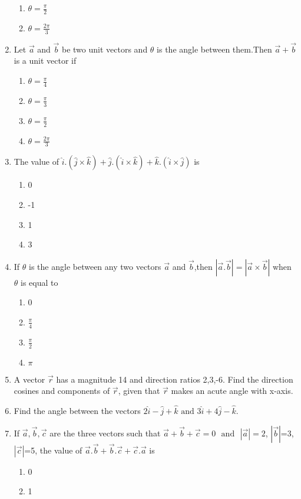 \begin{enumerate}[label=\thesubsection.\arabic*,ref=\thesubsection.\theenumi]
\begin{enumerate}
		\item $\theta = \frac{\pi}{2}$
		\item $\theta = \frac{2\pi}{3}$
			\end{enumerate}
\solution

\item Let $\vec{a}$ and $\vec{b}$ be two unit vectors and $\theta$ is the angle between them.Then $\vec{a}+\vec{b}$ is a unit vector if
\begin{enumerate}
\item $\theta=\frac{\pi}{4}$
\item $\theta=\frac{\pi}{3}$
\item $\theta=\frac{\pi}{2}$
\item $\theta=\frac{2\pi}{3}$
\end{enumerate}
\item The value of $\hat{i}.(\hat{j}\times\hat{k})+\hat{j}.(\hat{i}\times\hat{k})+\hat{k}.(\hat{i}\times\hat{j})$ is
\begin{enumerate}
\item 0
\item -1
\item 1
\item 3
\end{enumerate}
\item If $\theta$ is the angle between any two vectors $\vec{a}$ and $\vec{b}$,then $|\vec{a}.\vec{b}|=|\vec{a}\times\vec{b}|$ when $\theta$ is equal to
\begin{enumerate}
\item 0
\item $\frac{\pi}{4}$
\item $\frac{\pi}{2}$
\item $\pi$
\end{enumerate}
\item A vector $\vec{r}$ has a magnitude 14 and direction ratios 2,3,-6. Find the direction cosines and components of $\vec{r}$, given that $\vec{r}$ makes an acute angle with x-axis.
\item Find the angle between the vectors $2\hat{i}-\hat{j}+\hat{k}$ $\text{and}$ $3\hat{i}+4\hat{j}-\hat{k}$.
\item If $\vec{a},\vec{b},\vec{c}$ are the three vectors such that $\vec{a}+\vec{b}+\vec{c}=0$ $\text{ and }$ $|\vec{a}|=2$, $|\vec{b}|$=3, $|\vec{c}|$=5, the value of $\vec{a}.\vec{b}+\vec{b}.\vec{c}+\vec{c}.\vec{a}$ is
	\begin{enumerate}
\item 0
\item 1	

\end{enumerate}
\end{enumerate}
